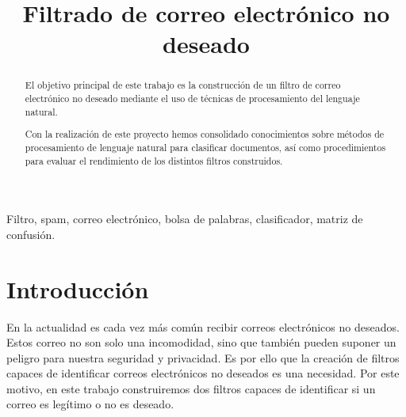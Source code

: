 \documentclass[conference,a4paper]{IEEEtran}
\begin{document}
\title{Filtrado de correo electrónico no deseado}

\author{
    
  \and 
 
  
  
}
\maketitle

\begin{abstract}
El objetivo principal de este trabajo es la construcción de un filtro de 		correo electrónico no deseado mediante el uso de técnicas de procesamiento del lenguaje natural.

Con la realización de este proyecto hemos consolidado conocimientos sobre métodos de procesamiento de lenguaje natural para clasificar documentos, así como procedimientos para evaluar el rendimiento de los distintos filtros construidos.
\end{abstract}

\begin{IEEEkeywords}
  Filtro, spam, correo electrónico, bolsa de palabras, clasificador, matriz de confusión.
\end{IEEEkeywords}


\section{Introducción}
En la actualidad es cada vez más común recibir correos electrónicos no deseados. Estos correo no son solo una incomodidad, sino que también pueden suponer un peligro para nuestra seguridad y privacidad. Es por ello que la creación de filtros capaces de identificar correos electrónicos no deseados es una necesidad. Por este motivo, en este trabajo construiremos dos filtros capaces de identificar si un correo es legítimo o no es deseado. \\
\end{document}

